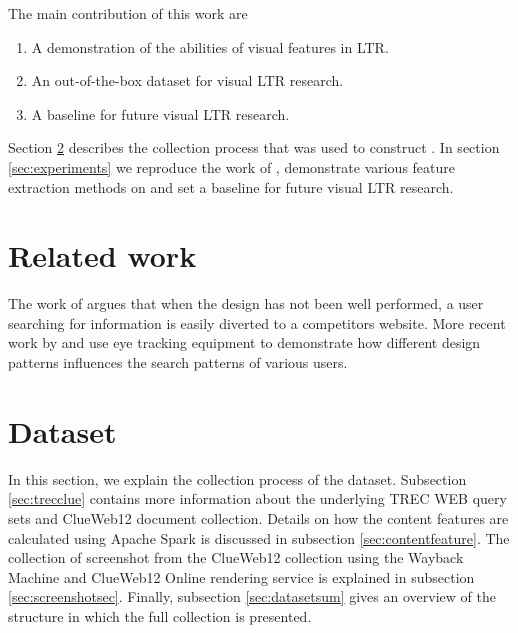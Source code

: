 The main contribution of this work are 
\begin{enumerate}  
\item A demonstration of the abilities of visual features in LTR.
\item An out-of-the-box dataset for visual LTR research.
\item A baseline for future visual LTR research.
\end{enumerate}

Section \ref{sec:dataset} describes the collection process that was used to construct \datasetname. In section \ref{sec:experiments} we reproduce the work of \citet{fan2017learning}, demonstrate various feature extraction methods on \datasetname and set a baseline for future visual LTR research.  



\section{Related work}\label{sec:relatedwork}
The work of \citet{nielsen1999designing} argues that when the design has not been well performed, a user searching for information is easily diverted to a competitors website. More recent work by \citet{nielsen2006f} and \citet{pernice2017f} use eye tracking equipment to demonstrate how different design patterns influences the search patterns of various users.


\section{Dataset}\label{sec:dataset}
In this section, we explain the collection process of the \datasetname dataset. Subsection \ref{sec:trecclue} contains more information about the underlying TREC WEB query sets and ClueWeb12 document collection. Details on how the content features are calculated using Apache Spark is discussed in subsection \ref{sec:contentfeature}. The collection of screenshot from the ClueWeb12 collection using the Wayback Machine and ClueWeb12 Online rendering service is explained in subsection \ref{sec:screenshotsec}. Finally, subsection \ref{sec:datasetsum} gives an overview of the structure in which the full collection is presented.

